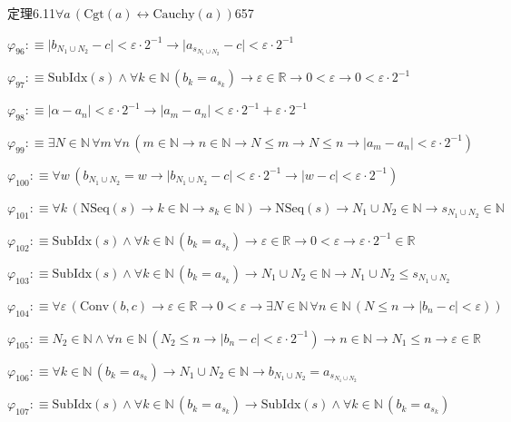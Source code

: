 \begin{fullproof}{定理6.11}{$\forall a\,(\mathrm{Cgt}(a) \leftrightarrow \mathrm{Cauchy}(a))$}{657}
\begin{abbrevlist}
\item $\varphi_{96} :\equiv \lvert b_{N_{1} \cup N_{2}} - c \rvert < \varepsilon \cdot 2^{-1} \to \lvert a_{s_{N_{1} \cup N_{2}}} - c \rvert < \varepsilon \cdot 2^{-1}$
\item $\varphi_{97} :\equiv \mathrm{SubIdx}(s) \land \forall k \in \mathbb{N}\,(b_{k} = a_{s_{k}}) \to \varepsilon \in \mathbb{R} \to 0 < \varepsilon \to 0 < \varepsilon \cdot 2^{-1}$
\item $\varphi_{98} :\equiv \lvert \alpha - a_{n} \rvert < \varepsilon \cdot 2^{-1} \to \lvert a_{m} - a_{n} \rvert < \varepsilon \cdot 2^{-1} + \varepsilon \cdot 2^{-1}$
\item $\varphi_{99} :\equiv \exists N \in \mathbb{N}\,\forall m\,\forall n\,(m \in \mathbb{N} \to n \in \mathbb{N} \to N \leq m \to N \leq n \to \lvert a_{m} - a_{n} \rvert < \varepsilon \cdot 2^{-1})$
\item $\varphi_{100} :\equiv \forall w\,(b_{N_{1} \cup N_{2}} = w \to \lvert b_{N_{1} \cup N_{2}} - c \rvert < \varepsilon \cdot 2^{-1} \to \lvert w - c \rvert < \varepsilon \cdot 2^{-1})$
\item $\varphi_{101} :\equiv \forall k\,(\mathrm{NSeq}(s) \to k \in \mathbb{N} \to s_{k} \in \mathbb{N}) \to \mathrm{NSeq}(s) \to N_{1} \cup N_{2} \in \mathbb{N} \to s_{N_{1} \cup N_{2}} \in \mathbb{N}$
\item $\varphi_{102} :\equiv \mathrm{SubIdx}(s) \land \forall k \in \mathbb{N}\,(b_{k} = a_{s_{k}}) \to \varepsilon \in \mathbb{R} \to 0 < \varepsilon \to \varepsilon \cdot 2^{-1} \in \mathbb{R}$
\item $\varphi_{103} :\equiv \mathrm{SubIdx}(s) \land \forall k \in \mathbb{N}\,(b_{k} = a_{s_{k}}) \to N_{1} \cup N_{2} \in \mathbb{N} \to N_{1} \cup N_{2} \leq s_{N_{1} \cup N_{2}}$
\item $\varphi_{104} :\equiv \forall \varepsilon\,(\mathrm{Conv}(b,c) \to \varepsilon \in \mathbb{R} \to 0 < \varepsilon \to \exists N \in \mathbb{N}\,\forall n \in \mathbb{N}\,(N \leq n \to \lvert b_{n} - c \rvert < \varepsilon))$
\item $\varphi_{105} :\equiv N_{2} \in \mathbb{N} \land \forall n \in \mathbb{N}\,(N_{2} \leq n \to \lvert b_{n} - c \rvert < \varepsilon \cdot 2^{-1}) \to n \in \mathbb{N} \to N_{1} \leq n \to \varepsilon \in \mathbb{R}$
\item $\varphi_{106} :\equiv \forall k \in \mathbb{N}\,(b_{k} = a_{s_{k}}) \to N_{1} \cup N_{2} \in \mathbb{N} \to b_{N_{1} \cup N_{2}} = a_{s_{N_{1} \cup N_{2}}}$
\item $\varphi_{107} :\equiv \mathrm{SubIdx}(s) \land \forall k \in \mathbb{N}\,(b_{k} = a_{s_{k}}) \to \mathrm{SubIdx}(s) \land \forall k \in \mathbb{N}\,(b_{k} = a_{s_{k}})$

\end{abbrevlist}
\end{fullproof}
